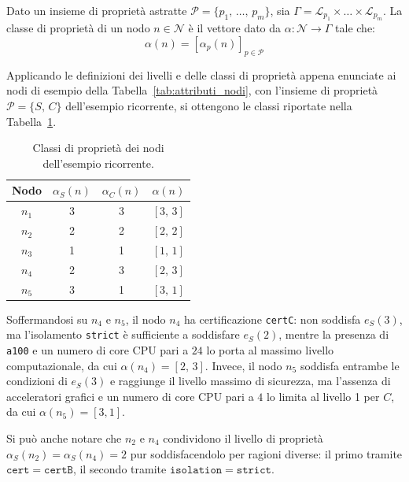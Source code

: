 \begin{definition}
    \label{def:classe_nodo}
    Dato un insieme di proprietà astratte $\mathcal{P} = \{p_1,\, \ldots,\, p_m\}$, sia $\Gamma = \mathcal{L}_{p_1} \times \ldots \times \mathcal{L}_{p_m}$. La classe di proprietà di un nodo $n \in \mathcal{N}$ è il vettore dato da $\alpha : \mathcal{N} \rightarrow \Gamma$ tale che:
    \begin{equation}
        \alpha(n) = \left[ \alpha_p(n) \right]_{p \in \mathcal{P}}
    \end{equation}
\end{definition}

Applicando le definizioni dei livelli e delle classi di proprietà appena enunciate ai nodi di esempio della Tabella~\ref{tab:attributi_nodi}, con l'insieme di proprietà $\mathcal{P} = \{S,\, C\}$ dell'esempio ricorrente, si ottengono le classi riportate nella Tabella~\ref{tab:classi_nodi}.

\begin{table}[ht]
    \centering
    \begin{tabular}{cccc}
        \toprule
        \textbf{Nodo} & $\alpha_S(n)$ & $\alpha_C(n)$ & $\alpha(n)$ \\
        \midrule
        $n_1$ & 3 & 3 & $[3,\,3]$ \\
        $n_2$ & 2 & 2 & $[2,\,2]$ \\
        $n_3$ & 1 & 1 & $[1,\,1]$ \\
        $n_4$ & 2 & 3 & $[2,\,3]$ \\
        $n_5$ & 3 & 1 & $[3,\,1]$ \\
        \bottomrule
    \end{tabular}
    \caption{Classi di proprietà dei nodi dell'esempio ricorrente.}
    \label{tab:classi_nodi}
\end{table}

Soffermandosi su $n_4$ e $n_5$, il nodo $n_4$ ha certificazione \texttt{certC}: non soddisfa $e_S(3)$, ma l'isolamento \texttt{strict} è sufficiente a soddisfare $e_S(2)$, mentre la presenza di \texttt{a100} e un numero di core CPU pari a $24$ lo porta al massimo livello computazionale, da cui $\alpha(n_4) = [2,\,3]$. Invece, il nodo $n_5$ soddisfa entrambe le condizioni di $e_S(3)$ e raggiunge il livello massimo di sicurezza, ma l'assenza di acceleratori grafici e un numero di core CPU pari a $4$ lo limita al livello 1 per $C$, da cui $\alpha(n_5) = [3,1]$. 

Si può anche notare che $n_2$ e $n_4$ condividono il livello di proprietà $\alpha_S(n_2) = \alpha_S(n_4) = 2$ pur soddisfacendolo per ragioni diverse: il primo tramite $\mathtt{cert=certB}$, il secondo tramite $\mathtt{isolation=strict}$. 

